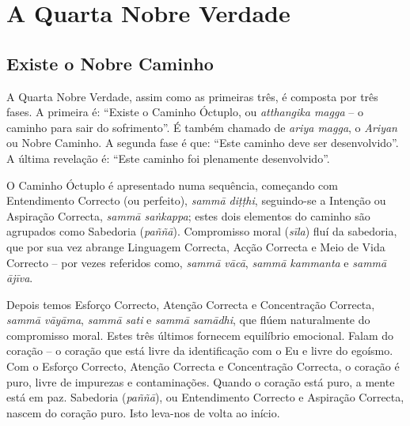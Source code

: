 
\chapter{A Quarta Nobre Verdade}

\pagestyle{topbottomcorner}

\section{Existe o Nobre Caminho}

A Quarta Nobre Verdade, assim como as primeiras três, é composta por três fases.
A primeira é: “Existe o Caminho Óctuplo, ou \emph{atthangika magga} – o caminho
para sair do sofrimento”. É também chamado de \emph{ariya magga}, o
\emph{Ariyan} ou Nobre Caminho. A segunda fase é que: “Este caminho deve ser
desenvolvido”. A última revelação é: “Este caminho foi plenamente desenvolvido”.

O Caminho Óctuplo é apresentado numa sequência, começando com Entendimento
Correcto (ou perfeito), \emph{sammā diṭṭhi}, seguindo-se a Intenção ou Aspiração
Correcta, \emph{sammā saṅkappa}; estes dois elementos do caminho são agrupados
como Sabedoria (\emph{paññā}). Compromisso moral (\emph{sīla}) fluí da
sabedoria, que por sua vez abrange Linguagem Correcta, Acção Correcta e Meio de
Vida Correcto – por vezes referidos como, \emph{sammā vācā}, \emph{sammā
  kammanta} e \emph{sammā ājīva}.

Depois temos Esforço Correcto, Atenção Correcta e Concentração Correcta,
\emph{sammā vāyāma}, \emph{sammā sati} e \emph{sammā samādhi}, que flúem
naturalmente do compromisso moral. Estes três últimos fornecem equilíbrio
emocional. Falam do coração – o coração que está livre da identificação com o Eu
e livre do egoísmo. Com o Esforço Correcto, Atenção Correcta e Concentração
Correcta, o coração é puro, livre de impurezas e contaminações. Quando o coração
está puro, a mente está em paz. Sabedoria (\emph{paññā}), ou Entendimento
Correcto e Aspiração Correcta, nascem do coração puro. Isto leva-nos de volta ao
início.

